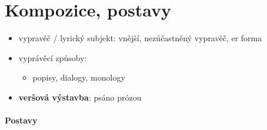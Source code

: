 \documentclass[10pt,a4paper]{article}
\begin{document}
\section*{Kompozice, postavy}
\begin{itemize}
\item vypravěč / lyrický subjekt: vnější, nezúčastněný vypravěč, er forma
\item vyprávěcí způsoby: 
	\begin{itemize}
	\item popisy, dialogy, monology
	\end{itemize}
\item \textbf{veršová výstavba}: psáno prózou
\end{itemize}

\paragraph{Postavy}
\end{document}
